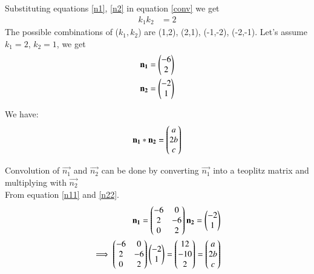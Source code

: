 \documentclass[journal,12pt,twocolumn]{IEEEtran}
\begin{document}
Substituting equations \eqref{n1}, \eqref{n2} in equation \eqref{conv} we get 
\begin{align}
    k_1k_2 &= 2
\end{align}
The possible combinations of ($k_1,k_2$) are (1,2), (2,1), (-1,-2), (-2,-1). 
Let's assume $k_1=2$, $k_2=1$, we get 
\begin{align}
    \mathbf{n_1}&=\begin{pmatrix}-6 \\ 2\end{pmatrix}\label{n11}\\
    \mathbf{n_2}&=\begin{pmatrix}-2 \\ 1\end{pmatrix}\label{n22}
\end{align}

We have:
\begin{align}
\mathbf{n_1}\ast \mathbf{n_2} = \begin{pmatrix}a\\2b\\c\end{pmatrix} \label{eq:conv1}
\end{align}

Convolution of $\vec{n_1}$ and $\vec{n_2}$ can be done by converting  $\vec{n_1}$ into a teoplitz matrix and multiplying with $\vec{n_2}$\\
From equation \eqref{n11} and \eqref{n22}. 
\begin{align}
    \mathbf{n_1}=\begin{pmatrix}-6 & 0 \\ 2 & -6 \\ 0 & 2\end{pmatrix}
    \mathbf{n_2}=\begin{pmatrix}-2 \\ 1\end{pmatrix} \label{eq:conv2}\\
    \implies\begin{pmatrix}-6 & 0 \\ 2 & -6 \\ 0 & 2\end{pmatrix}\begin{pmatrix}-2 \\ 1\end{pmatrix} = \begin{pmatrix}12 \\ -10 \\ 2\end{pmatrix} = \begin{pmatrix}a\\2b\\c\end{pmatrix}\label{eq:conv3}
\end{align}
\end{document}
